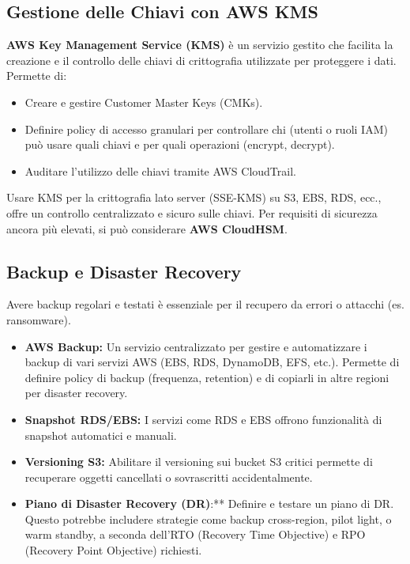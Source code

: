 \subsection{Gestione delle Chiavi con AWS KMS}
\label{subsec:kms}
\textbf{AWS Key Management Service (KMS)} è un servizio gestito che facilita la creazione e il controllo delle chiavi di crittografia utilizzate per proteggere i dati. Permette di:
\begin{itemize}
    \item Creare e gestire Customer Master Keys (CMKs).
    \item Definire policy di accesso granulari per controllare chi (utenti o ruoli IAM) può usare quali chiavi e per quali operazioni (encrypt, decrypt).
    \item Auditare l'utilizzo delle chiavi tramite AWS CloudTrail.
\end{itemize}
Usare KMS per la crittografia lato server (SSE-KMS) su S3, EBS, RDS, ecc., offre un controllo centralizzato e sicuro sulle chiavi. Per requisiti di sicurezza ancora più elevati, si può considerare \textbf{AWS CloudHSM}.

\subsection{Backup e Disaster Recovery}
\label{subsec:backup-dr}
Avere backup regolari e testati è essenziale per il recupero da errori o attacchi (es. ransomware).
\begin{itemize}
    \item \textbf{AWS Backup:} Un servizio centralizzato per gestire e automatizzare i backup di vari servizi AWS (EBS, RDS, DynamoDB, EFS, etc.). Permette di definire policy di backup (frequenza, retention) e di copiarli in altre regioni per disaster recovery.
    \item \textbf{Snapshot RDS/EBS:} I servizi come RDS e EBS offrono funzionalità di snapshot automatici e manuali.
    \item \textbf{Versioning S3:} Abilitare il versioning sui bucket S3 critici permette di recuperare oggetti cancellati o sovrascritti accidentalmente.
    \item \textbf{Piano di Disaster Recovery (DR)}:** Definire e testare un piano di DR. Questo potrebbe includere strategie come backup cross-region, pilot light, o warm standby, a seconda dell'RTO (Recovery Time Objective) e RPO (Recovery Point Objective) richiesti.
\end{itemize}

